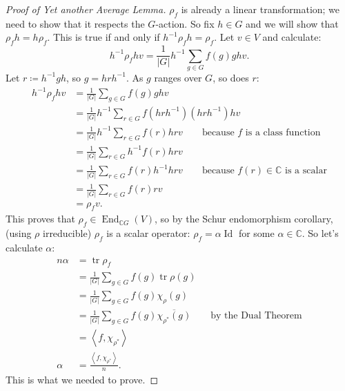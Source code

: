\documentclass[12pt]{article}
\newcommand{\cx}{\mathbb{C}}
\newcommand\inv[1]{#1^{-1}}
\theoremstyle{definition}
\DeclareMathOperator\End{End}
\DeclareMathOperator\Id{Id}
\DeclareMathOperator\tr{tr}
\begin{document}
\begin{proof}[Proof of Yet another Average Lemma]
    $\rho_f$ is already a linear transformation; we need to show that it respects the $G$-action. So fix $h \in G$ and we will show that $\rho_f h = h \rho_f$. This is true if and only if $\inv{h} \rho_f h = \rho_f$. Let $v \in V$ and calculate: 
    \begin{equation}
        \inv{h} \rho_f h v = \frac{1}{|G|} \inv{h} \sum\limits_{g \in G} f(g) g h v.
    \end{equation}
    Let $r \coloneqq  \inv{h} g h$, so $g = h r \inv{h}$. As $g$ ranges over $G$, so does $r$:
    \begin{equation}
        \begin{split}
            \inv{h} \rho_f h v & = \frac{1}{|G|} \sum\limits_{g \in G} f(g) g h v \\
            & = \frac{1}{|G|} \inv{h} \sum\limits_{r \in G} f \left( h r \inv{h} \right) \left( h r \inv{h} \right) h v \\
            & = \frac{1}{|G|} \inv{h} \sum\limits_{r \in G} f(r) h r v \qquad \text{because $f$ is a class function} \\
            & = \frac{1}{|G|} \sum\limits_{r \in G} \inv{h} f(r) h r v \\
            & = \frac{1}{|G|} \sum\limits_{r \in G} f(r) \inv{h} h r v \qquad \text{because $f(r) \in \cx$ is a scalar} \\ 
            & = \frac{1}{|G|} \sum\limits_{r \in G} f(r) r v \\
            & = \rho_f v.
        \end{split}
    \end{equation}
    This proves that $\rho_f \in \End_{\cx G} (V)$, so by the Schur endomorphism corollary, (using $\rho$ irreducible) $\rho_f$ is a scalar operator: $\rho_f = \alpha \Id$ for some $\alpha \in \cx$. So let's calculate $\alpha$:
    \begin{equation}
        \begin{split}
            n \alpha & = \tr \rho_f \\
            & = \frac{1}{|G|} \sum\limits_{g \in G} f(g) \tr \rho(g) \\
            & = \frac{1}{|G|} \sum\limits_{g \in G} f(g) \chi_{\rho}(g) \\
            & = \frac{1}{|G|} \sum\limits_{g \in G} f(g) \overline{\chi_{\rho^*}(g)} \qquad \text{by the Dual Theorem} \\
            & = \left \langle f , \chi_{\rho^*} \right \rangle \\
            \alpha & = \boxed{ \frac{\left \langle f , \chi_{\rho^*} \right \rangle}{n} .}
        \end{split}
    \end{equation}
    This is what we needed to prove.
\end{proof}
\end{document}
